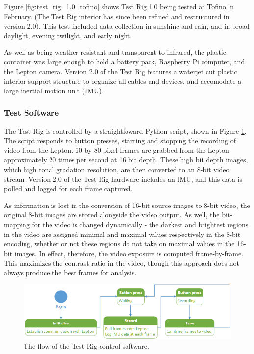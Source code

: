 Figure \ref{fig:test_rig_1.0_tofino} shows Test Rig 1.0 being tested at Tofino in February. (The Test Rig interior has since been refined and restructured in version 2.0). This test included data collection in sunshine and rain, and in broad daylight, evening twilight, and early night.

As well as being weather resistant and transparent to infrared, the plastic container was large enough to hold a battery pack, Raspberry Pi computer, and  the Lepton camera. Version 2.0 of the Test Rig features a waterjet cut plastic interior support structure to organize all cables and devices, and accomodate a large inertial motion unit (IMU).

\subsubsection{\label{sec:discussion:equipment:software}Test Software}
The Test Rig is controlled by a straightfoward Python script, shown in Figure \ref{fig:test-rig-software}. The script responds to button presses, starting and stopping the recording of video from the Lepton. 60 by 80 pixel frames are grabbed from the Lepton approximately 20 times per second at 16 bit depth. These high bit depth images, which high tonal gradation resolution, are then converted to an 8-bit video stream. Version 2.0 of the Test Rig hardware includes an IMU, and this data is polled and logged for each frame captured.

As information is lost in the conversion of 16-bit source images to 8-bit video, the original 8-bit images are stored alongside the video output. As well, the bit-mapping for the video is changed dynamically - the darkest and brightest regions in the video are assigned minimal and maximal values respectively in the 8-bit encoding, whether or not these regions do not take on maximal values in the 16-bit images. In effect, therefore, the video exposure is computed frame-by-frame. This maximizes the contrast ratio in the video, though this approach does not always produce the best frames for analysis.

\begin{figure}
\centering
\includegraphics[width=\linewidth]{"./image/button_py"}
\caption[Test Rig software flow]{\label{fig:test-rig-software}The flow of the Test Rig control software.}
\end{figure}
